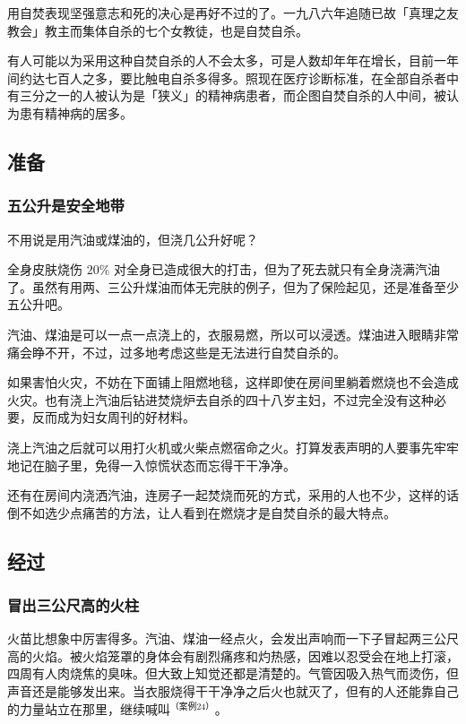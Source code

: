 \documentclass[UTF8]{ctexart}
\begin{document}
用自焚表现坚强意志和死的决心是再好不过的了。一九八六年追随已故「真理之友教会」教主而集体自杀的七个女教徒，也是自焚自杀。

有人可能以为采用这种自焚自杀的人不会太多，可是人数却年年在增长，目前一年间约达七百人之多，要比触电自杀多得多。照现在医疗诊断标准，在全部自杀者中有三分之一的人被认为是「狭义」的精神病患者，而企图自焚自杀的人中间，被认为患有精神病的居多。

\subsection{准备}

\subsubsection*{五公升是安全地带}

不用说是用汽油或煤油的，但浇几公升好呢？ 

全身皮肤烧伤 $20\%$ 对全身已造成很大的打击，但为了死去就只有全身浇满汽油了。虽然有用两、三公升煤油而体无完肤的例子，但为了保险起见，还是准备至少五公升吧。

汽油、煤油是可以一点一点浇上的，衣服易燃，所以可以浸透。煤油进入眼睛非常痛会睁不开，不过，过多地考虑这些是无法进行自焚自杀的。

如果害怕火灾，不妨在下面铺上阻燃地毯，这样即使在房间里躺着燃烧也不会造成火灾。也有浇上汽油后钻进焚烧炉去自杀的四十八岁主妇，不过完全没有这种必要，反而成为妇女周刊的好材料。

浇上汽油之后就可以用打火机或火柴点燃宿命之火。打算发表声明的人要事先牢牢地记在脑子里，免得一入惊慌状态而忘得干干净净。

还有在房间内浇洒汽油，连房子一起焚烧而死的方式，采用的人也不少，这样的话倒不如选少点痛苦的方法，让人看到在燃烧才是自焚自杀的最大特点。

\subsection{经过}

\subsubsection*{冒出三公尺高的火柱}

火苗比想象中厉害得多。汽油、煤油一经点火，会发出声响而一下子冒起两三公尺高的火焰。被火焰笼罩的身体会有剧烈痛疼和灼热感，因难以忍受会在地上打滚，四周有人肉烧焦的臭味。但大致上知觉还都是清楚的。气管因吸入热气而烫伤，但声音还是能够发出来。当衣服烧得干干净净之后火也就灭了，但有的人还能靠自己的力量站立在那里，继续喊叫$^{（ 案例 24）}$。 
\end{document}
